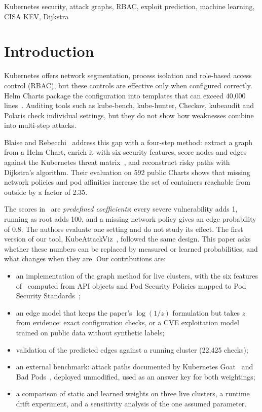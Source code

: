 \documentclass[conference]{IEEEtran}
\begin{document}
\begin{IEEEkeywords}
Kubernetes security, attack graphs, RBAC, exploit prediction, machine learning, CISA KEV, Dijkstra
\end{IEEEkeywords}

\section{Introduction}
Kubernetes offers network segmentation, process isolation and role-based access control (RBAC), but these controls are
effective only when configured correctly. Helm Charts package the configuration into templates that can exceed 40,000
lines~\cite{blaise2022}. Auditing tools such as kube-bench, kube-hunter, Checkov, kubeaudit and Polaris check individual
settings, but they do not show how weaknesses combine into multi-step attacks.

Blaise and Rebecchi~\cite{blaise2022} address this gap with a four-step method: extract a graph from a Helm Chart, enrich it
with six security features, score nodes and edges against the Kubernetes threat matrix~\cite{mstm}, and reconstruct risky paths
with Dijkstra's algorithm. Their evaluation on 592 public Charts shows that missing network policies and pod affinities increase
the set of containers reachable from outside by a factor of 2.35.

The scores in~\cite{blaise2022} are \emph{predefined coefficients}: every severe vulnerability adds 1, running as root adds 100,
and a missing network policy gives an edge probability of 0.8. The authors evaluate one setting and do not study its effect.
The first version of our tool, KubeAttackViz~\cite{kav}, followed the same design. This paper asks whether these numbers can be
replaced by measured or learned probabilities, and what changes when they are. Our contributions are:
\begin{itemize}
\item an implementation of the graph method for live clusters, with the six features of~\cite{blaise2022} computed from API
objects and Pod Security Policies mapped to Pod Security Standards~\cite{pss};
\item an edge model that keeps the paper's $\log(1/z)$ formulation but takes $z$ from evidence: exact configuration checks, or a
CVE exploitation model trained on public data without synthetic labels;
\item validation of the predicted edges against a running cluster (22,425 checks);
\item an external benchmark: attack paths documented by Kubernetes Goat~\cite{goat} and Bad Pods~\cite{badpods}, deployed
unmodified, used as an answer key for both weightings;
\item a comparison of static and learned weights on three live clusters, a runtime drift experiment, and a sensitivity analysis
of the one assumed parameter.
\end{itemize}
\end{document}
